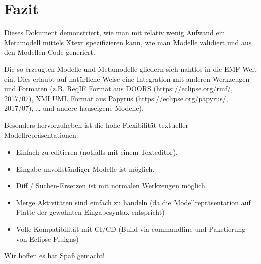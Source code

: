 \documentclass[]{article}
\providecommand{\tightlist}{%
  \setlength{\itemsep}{0pt}\setlength{\parskip}{0pt}}
\begin{document}
\section[Fazit]{\texorpdfstring{\protect\hypertarget{anchor-56}{}{}Fazit}{Fazit}}\label{fazit}

Dieses Dokument demonstriert, wie man mit relativ wenig Aufwand ein
Metamodell mittels Xtext spezifizieren kann, wie man Modelle validiert
und aus den Modellen Code generiert.

Die so erzeugten Modelle und Metamodelle gliedern sich nahtlos in die
EMF Welt ein. Dies erlaubt auf natürliche Weise eine Integration mit
anderen Werkzeugen und Formaten (z.B. ReqIF Format aus DOORS
(\url{https://eclipse.org/rmf/}, 2017/07), XMI UML Format aus Papyrus
(\url{https://eclipse.org/papyrus/}, 2017/07), \ldots{} und andere
hauseigene Modelle).

Besonders hervorzuheben ist die hohe Flexibilität textueller
Modellrepräsentationen:

\begin{itemize}
\tightlist
\item
  Einfach zu editieren (notfalls mit einem Texteditor).
\item
  Eingabe unvollständiger Modelle ist möglich.
\item
  Diff / Suchen-Ersetzen ist mit normalen Werkzeugen möglich.
\item
  Merge Aktivitäten sind einfach zu handeln (da die Modellrepräsentation
  auf Platte der gewohnten Eingabesyntax entspricht)
\item
  Volle Kompatibilität mit CI/CD (Build via commandline und Paketierung
  von Eclipse-Pluigns)
\end{itemize}

Wir hoffen es hat Spaß gemacht!
\end{document}
